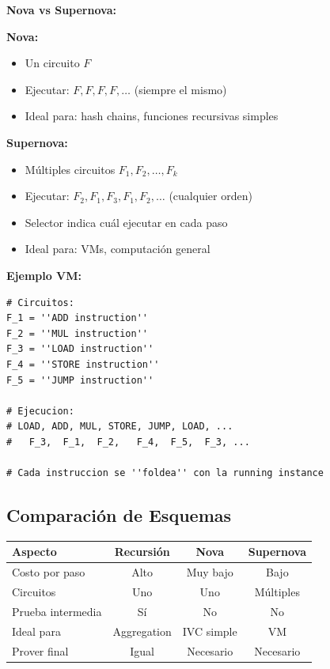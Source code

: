 \documentclass[11pt,a4paper,twoside]{book}
\begin{document}
\begin{keyidea}
\textbf{Nova vs Supernova:}

\textbf{Nova:}
\begin{itemize}
    \item Un circuito $F$
    \item Ejecutar: $F, F, F, F, \ldots$ (siempre el mismo)
    \item Ideal para: hash chains, funciones recursivas simples
\end{itemize}

\textbf{Supernova:}
\begin{itemize}
    \item M\'ultiples circuitos $F_1, F_2, \ldots, F_k$
    \item Ejecutar: $F_2, F_1, F_3, F_1, F_2, \ldots$ (cualquier orden)
    \item Selector indica cu\'al ejecutar en cada paso
    \item Ideal para: VMs, computaci\'on general
\end{itemize}

\textbf{Ejemplo VM:}
\begin{lstlisting}[style=python]
# Circuitos:
F_1 = ''ADD instruction''
F_2 = ''MUL instruction''
F_3 = ''LOAD instruction''
F_4 = ''STORE instruction''
F_5 = ''JUMP instruction''

# Ejecucion:
# LOAD, ADD, MUL, STORE, JUMP, LOAD, ...
#   F_3,  F_1,  F_2,   F_4,  F_5,  F_3, ...

# Cada instruccion se ''foldea'' con la running instance
\end{lstlisting}
\end{keyidea}

\subsection{Comparaci\'on de Esquemas}

\begin{center}
\begin{tabular}{lccc}
\toprule
\textbf{Aspecto} & \textbf{Recursi\'on} & \textbf{Nova} & \textbf{Supernova} \\
\midrule
Costo por paso & Alto & Muy bajo & Bajo \\
Circuitos & Uno & Uno & M\'ultiples \\
Prueba intermedia & S\'i & No & No \\
Ideal para & Aggregation & IVC simple & VM \\
Prover final & Igual & Necesario & Necesario \\
\bottomrule
\end{tabular}
\end{center}
\end{document}
